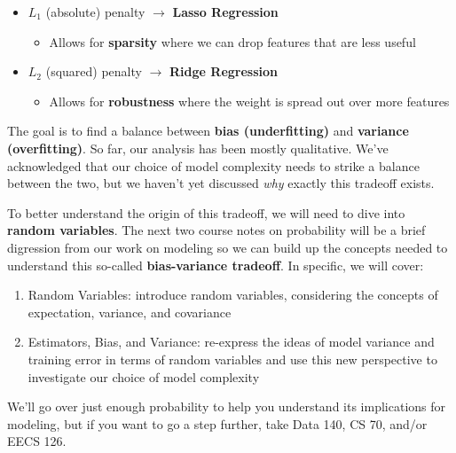 \documentclass[
  letterpaper,
  DIV=11,
  numbers=noendperiod]{scrreprt}
\providecommand{\tightlist}{%
  \setlength{\itemsep}{0pt}\setlength{\parskip}{0pt}}\usepackage{longtable,booktabs,array}
\begin{document}
\begin{itemize}
\tightlist
\item
  \(L_1\) (absolute) penalty \(\rightarrow\) \textbf{Lasso Regression}

  \begin{itemize}
  \tightlist
  \item
    Allows for \textbf{sparsity} where we can drop features that are
    less useful
  \end{itemize}
\item
  \(L_2\) (squared) penalty \(\rightarrow\) \textbf{Ridge Regression}

  \begin{itemize}
  \tightlist
  \item
    Allows for \textbf{robustness} where the weight is spread out over
    more features
  \end{itemize}
\end{itemize}

The goal is to find a balance between \textbf{bias (underfitting)} and
\textbf{variance (overfitting)}. So far, our analysis has been mostly
qualitative. We've acknowledged that our choice of model complexity
needs to strike a balance between the two, but we haven't yet discussed
\emph{why} exactly this tradeoff exists.

To better understand the origin of this tradeoff, we will need to dive
into \textbf{random variables}. The next two course notes on probability
will be a brief digression from our work on modeling so we can build up
the concepts needed to understand this so-called \textbf{bias-variance
tradeoff}. In specific, we will cover:

\begin{enumerate}
\def\labelenumi{\arabic{enumi}.}
\tightlist
\item
  Random Variables: introduce random variables, considering the concepts
  of expectation, variance, and covariance
\item
  Estimators, Bias, and Variance: re-express the ideas of model variance
  and training error in terms of random variables and use this new
  perspective to investigate our choice of model complexity
\end{enumerate}

We'll go over just enough probability to help you understand its
implications for modeling, but if you want to go a step further, take
Data 140, CS 70, and/or EECS 126.
\end{document}
